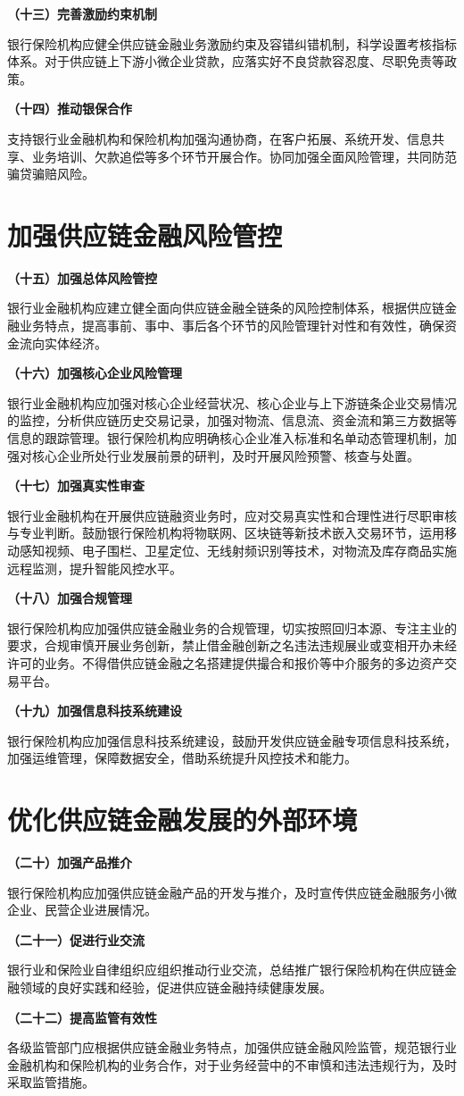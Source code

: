 { \bf （十三）完善激励约束机制}

银行保险机构应健全供应链金融业务激励约束及容错纠错机制，科学设置考核指标体系。对于供应链上下游小微企业贷款，应落实好不良贷款容忍度、尽职免责等政策。

{ \bf （十四）推动银保合作}

支持银行业金融机构和保险机构加强沟通协商，在客户拓展、系统开发、信息共享、业务培训、欠款追偿等多个环节开展合作。协同加强全面风险管理，共同防范骗贷骗赔风险。

\section{加强供应链金融风险管控}

{ \bf （十五）加强总体风险管控}

银行业金融机构应建立健全面向供应链金融全链条的风险控制体系，根据供应链金融业务特点，提高事前、事中、事后各个环节的风险管理针对性和有效性，确保资金流向实体经济。

{ \bf （十六）加强核心企业风险管理}

银行业金融机构应加强对核心企业经营状况、核心企业与上下游链条企业交易情况的监控，分析供应链历史交易记录，加强对物流、信息流、资金流和第三方数据等信息的跟踪管理。银行保险机构应明确核心企业准入标准和名单动态管理机制，加强对核心企业所处行业发展前景的研判，及时开展风险预警、核查与处置。

{ \bf （十七）加强真实性审查}

银行业金融机构在开展供应链融资业务时，应对交易真实性和合理性进行尽职审核与专业判断。鼓励银行保险机构将物联网、区块链等新技术嵌入交易环节，运用移动感知视频、电子围栏、卫星定位、无线射频识别等技术，对物流及库存商品实施远程监测，提升智能风控水平。

{ \bf （十八）加强合规管理}

银行保险机构应加强供应链金融业务的合规管理，切实按照回归本源、专注主业的要求，合规审慎开展业务创新，禁止借金融创新之名违法违规展业或变相开办未经许可的业务。不得借供应链金融之名搭建提供撮合和报价等中介服务的多边资产交易平台。

{ \bf （十九）加强信息科技系统建设}

银行保险机构应加强信息科技系统建设，鼓励开发供应链金融专项信息科技系统，加强运维管理，保障数据安全，借助系统提升风控技术和能力。

\section{优化供应链金融发展的外部环境}

{ \bf （二十）加强产品推介}

银行保险机构应加强供应链金融产品的开发与推介，及时宣传供应链金融服务小微企业、民营企业进展情况。

{ \bf （二十一）促进行业交流}

银行业和保险业自律组织应组织推动行业交流，总结推广银行保险机构在供应链金融领域的良好实践和经验，促进供应链金融持续健康发展。

{ \bf （二十二）提高监管有效性}

各级监管部门应根据供应链金融业务特点，加强供应链金融风险监管，规范银行业金融机构和保险机构的业务合作，对于业务经营中的不审慎和违法违规行为，及时采取监管措施。 \\

